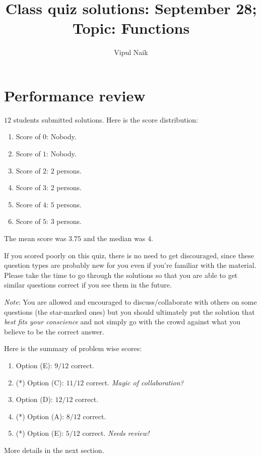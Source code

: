 \documentclass[10pt]{amsart}
\title{Class quiz solutions: September 28; Topic: Functions}
\author{Vipul Naik}
\begin{document}
\maketitle

\section{Performance review}

$12$ students submitted solutions. Here is the score distribution:

\begin{enumerate}
\item Score of $0$: Nobody.
\item Score of $1$: Nobody.
\item Score of $2$: $2$ persons.
\item Score of $3$: $2$ persons.
\item Score of $4$: $5$ persons.
\item Score of $5$: $3$ persons.
\end{enumerate}

The mean score was $3.75$ and the median was $4$.

If you scored poorly on this quiz, there is no need to get
discouraged, since these question types are probably new for you even
if you're familiar with the material. Please take the time to go
through the solutions so that you are able to get similar questions
correct if you see them in the future.

{\em Note}: You are allowed and encouraged to discuss/collaborate with
others on some questions (the star-marked ones) but you should
ultimately put the solution that {\em best fits your conscience} and
not simply go with the crowd against what you believe to be the
correct answer.

Here is the summary of problem wise scores:

\begin{enumerate}
\item Option (E): $9/12$ correct.
\item (*) Option (C): $11/12$ correct. {\em Magic of collaboration?}
\item Option (D): $12/12$ correct.
\item (*) Option (A): $8/12$ correct.
\item (*) Option (E): $5/12$ correct. {\em Needs review!}
\end{enumerate}

More details in the next section.
\end{document}
